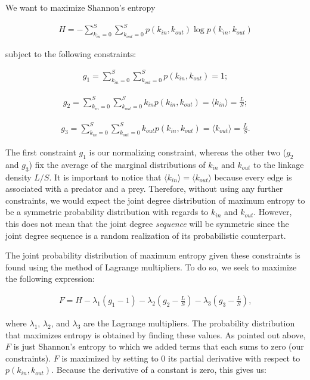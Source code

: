 We want to maximize Shannon's entropy 

\begin{eqnarray}
\label{eq:entropy_jdd}
        H = -\sum_{k_{in}=0}^S\sum_{k_{out}=0}^S p(k_{in},k_{out}) \log p(k_{in},k_{out})
\end{eqnarray}

subject to the following constraints:

\begin{eqnarray}
\label{eq:g1}
        g_1 = \sum_{k_{in}=0}^S\sum_{k_{out}=0}^S p(k_{in},k_{out}) = 1;
\end{eqnarray}

\begin{eqnarray}
\label{eq:g2}
        g_2 = \sum_{k_{in}=0}^S\sum_{k_{out}=0}^S k_{in} p(k_{in},k_{out}) = \langle k_{in} \rangle = \frac{L}{S};
\end{eqnarray}

\begin{eqnarray}
\label{eq:g3}
        g_3 = \sum_{k_{in}=0}^S\sum_{k_{out}=0}^S k_{out} p(k_{in},k_{out}) = \langle k_{out} \rangle = \frac{L}{S}.
\end{eqnarray}

The first constraint $g_1$ is our normalizing constraint, whereas the other two
($g_2$ and $g_3$) fix the average of the marginal distributions of $k_{in}$ and
$k_{out}$ to the linkage density $L/S$. It is important to notice that $\langle
k_{in} \rangle = \langle k_{out} \rangle$ because every edge is associated with
a predator and a prey. Therefore, without using any further constraints, we
would expect the joint degree distribution of maximum entropy to be a symmetric
probability distribution with regards to $k_{in}$ and $k_{out}$. However, this
does not mean that the joint degree \textit{sequence} will be symmetric since
the joint degree sequence is a random realization of its probabilistic
counterpart. 

The joint probability distribution of maximum entropy given these constraints is
found using the method of Lagrange multipliers. To do so, we seek to maximize
the following expression:

\begin{eqnarray}
\label{eq:F_jdd}
        F = H - \lambda_1(g_1-1)-\lambda_2\left( g_2-\frac{L}{S}\right) -
        \lambda_3 \left( g_3-\frac{L}{S}\right),
\end{eqnarray}

where $\lambda_1$, $\lambda_2$, and $\lambda_3$ are the Lagrange multipliers.
The probability distribution that maximizes entropy is obtained by finding these
values. As pointed out above, $F$ is just Shannon's entropy to which we added
terms that each sums to zero (our constraints). $F$ is maximized by setting to 0
its partial derivative with respect to $p(k_{in},k_{out})$. Because the
derivative of a constant is zero, this gives us:

